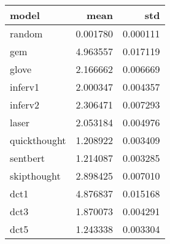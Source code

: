 \begin{tabular}{lrr}
\toprule
        model &      mean &       std \\
\midrule
       random &  0.001780 &  0.000111 \\
          gem &  4.963557 &  0.017119 \\
        glove &  2.166662 &  0.006669 \\
      inferv1 &  2.000347 &  0.004357 \\
      inferv2 &  2.306471 &  0.007293 \\
        laser &  2.053184 &  0.004976 \\
 quickthought &  1.208922 &  0.003409 \\
     sentbert &  1.214087 &  0.003285 \\
  skipthought &  2.898425 &  0.007010 \\
         dct1 &  4.876837 &  0.015168 \\
         dct3 &  1.870073 &  0.004291 \\
         dct5 &  1.243338 &  0.003304 \\
\bottomrule
\end{tabular}
